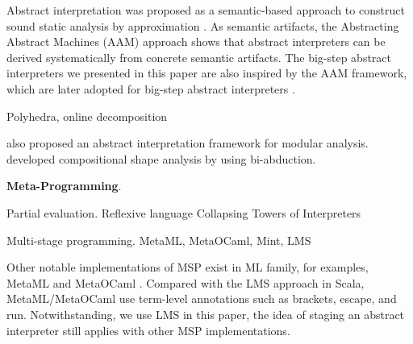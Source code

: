 Abstract interpretation was proposed as a semantic-based approach to construct sound static analysis by approximation \cite{DBLP:conf/popl/CousotC77}.
As semantic artifacts, the Abstracting Abstract Machines (AAM) \cite{DBLP:journals/jfp/HornM12, DBLP:conf/icfp/HornM10}
approach shows that abstract interpreters can be derived systematically from concrete semantic artifacts.
The big-step abstract interpreters we presented in this paper are also inspired by the AAM framework,
which are later adopted for big-step abstract interpreters \cite{DBLP:journals/pacmpl/DaraisLNH17, Wei:2018:RAA:3243631.3236800}.

Polyhedra, online decomposition

\citet{DBLP:conf/cc/CousotC02} also proposed an abstract interpretation framework for modular analysis.
\citet{DBLP:conf/popl/CalcagnoDOY09} developed compositional shape analysis by using bi-abduction.

\textbf{Meta-Programming}.

Partial evaluation. 
Reflexive language \cite{DBLP:conf/gpce/Asai14}
Collapsing Towers of Interpreters \cite{Amin:2017:CTI:3177123.3158140}

Multi-stage programming. MetaML, MetaOCaml, Mint, LMS

Other notable implementations of MSP exist in ML family, for examples, MetaML \cite{DBLP:conf/pepm/TahaS97} 
and MetaOCaml \cite{DBLP:conf/gpce/CalcagnoTHL03, DBLP:conf/flops/Kiselyov14}.
Compared with the LMS approach in Scala, MetaML/MetaOCaml use term-level annotations such as brackets, 
escape, and run. Notwithstanding, we use LMS in this paper, the idea of staging an abstract interpreter
still applies with other MSP implementations.

